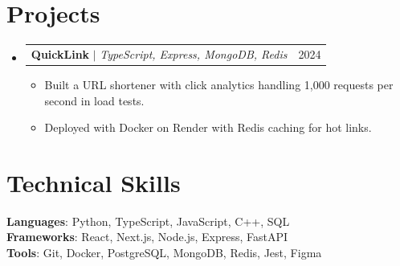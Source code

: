 \documentclass[letterpaper,11pt]{article}
\makeatletter
\newcommand{\resumeItem}[1]{
  \item\small{
    {#1 \vspace{-2pt}}
  }
}
\newcommand{\resumeProjectHeading}[2]{
    \item
    \begin{tabular*}{0.97\textwidth}{l@{\extracolsep{\fill}}r}
      \small#1 & #2 \\
    \end{tabular*}\vspace{-7pt}
}
\newcommand{\resumeSubHeadingListStart}{\begin{itemize}[leftmargin=0.15in, label={}]}
\newcommand{\resumeSubHeadingListEnd}{\end{itemize}}
\newcommand{\resumeItemListStart}{\begin{itemize}}
\newcommand{\resumeItemListEnd}{\end{itemize}\vspace{-5pt}}
\makeatother
\begin{document}
\section{Projects}
    \resumeSubHeadingListStart
      \resumeProjectHeading
          {\textbf{QuickLink} $|$ \emph{TypeScript, Express, MongoDB, Redis}}{2024}
          \resumeItemListStart
            \resumeItem{Built a URL shortener with click analytics handling 1,000 requests per second in load tests.}
            \resumeItem{Deployed with Docker on Render with Redis caching for hot links.}
          \resumeItemListEnd
    \resumeSubHeadingListEnd

\section{Technical Skills}
 \begin{itemize}[leftmargin=0.15in, label={}]
    \small{\item{
     \textbf{Languages}{: Python, TypeScript, JavaScript, C++, SQL} \\
     \textbf{Frameworks}{: React, Next.js, Node.js, Express, FastAPI} \\
     \textbf{Tools}{: Git, Docker, PostgreSQL, MongoDB, Redis, Jest, Figma}
    }}
 \end{itemize}
\end{document}
